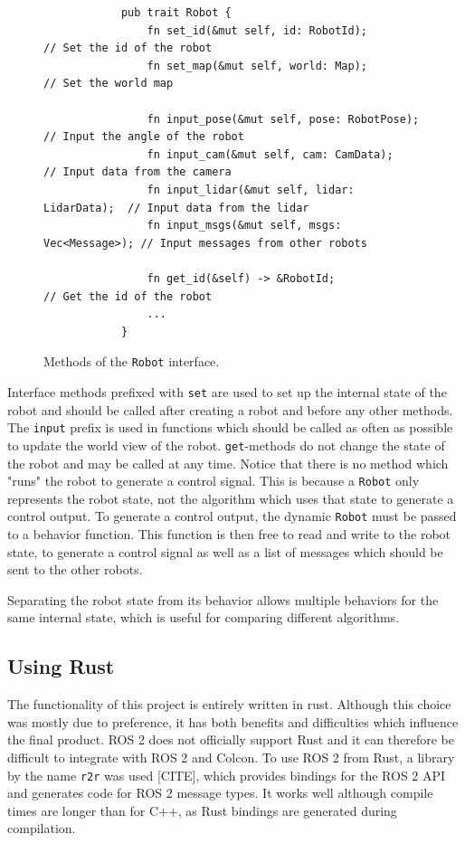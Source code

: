 \begin{figure}[H]
    \begin{center}
        \begin{verbatim}
            pub trait Robot {
                fn set_id(&mut self, id: RobotId);            // Set the id of the robot
                fn set_map(&mut self, world: Map);            // Set the world map

                fn input_pose(&mut self, pose: RobotPose);    // Input the angle of the robot
                fn input_cam(&mut self, cam: CamData);        // Input data from the camera
                fn input_lidar(&mut self, lidar: LidarData);  // Input data from the lidar
                fn input_msgs(&mut self, msgs: Vec<Message>); // Input messages from other robots

                fn get_id(&self) -> &RobotId;                 // Get the id of the robot
                ...
            }
        \end{verbatim}
    \end{center}
    \caption{Methods of the \texttt{Robot} interface.}\label{fig:robot-interface}
\end{figure}

Interface methods prefixed with \texttt{set} are used to set up the internal state of the robot and should be called after creating a robot and before any other methods. The \texttt{input} prefix is used in functions which should be called as often as possible to update the world view of the robot. \texttt{get}-methods do not change the state of the robot and may be called at any time. Notice that there is no method which "runs" the robot to generate a control signal. This is because a \texttt{Robot} only represents the robot state, not the algorithm which uses that state to generate a control output. To generate a control output, the dynamic \texttt{Robot} must be passed to a behavior function. This function is then free to read and write to the robot state, to generate a control signal as well as a list of messages which should be sent to the other robots.

Separating the robot state from its behavior allows multiple behaviors for the same internal state, which is useful for comparing different algorithms.

\subsection{Using Rust}
The {\color{red} functionality} of this project is entirely written in rust. Although this choice was mostly due to preference, it has both benefits and difficulties which influence the {\color{red} final product}. ROS 2 does not officially support Rust and it can therefore be difficult to integrate with ROS 2 and Colcon. To use ROS 2 from Rust, a library by the name \texttt{r2r} was used {\color{red}[CITE]}, which provides bindings for the ROS 2 API and generates code for ROS 2 message types. It works well although compile times are longer than for C++, as Rust bindings are generated during compilation. \\

